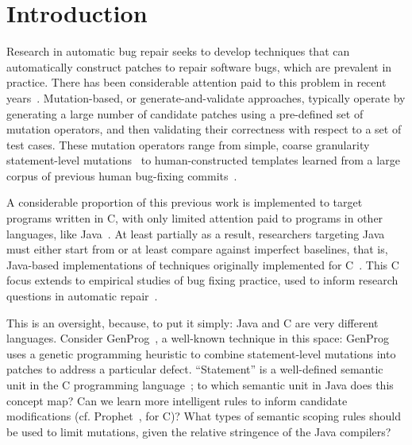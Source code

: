 \documentclass{sig-alternate-05-2015}
\begin{document}
%
%
\printccsdesc



\section{Introduction}

Research in automatic bug repair seeks to develop techniques that can
automatically construct patches to repair software bugs, which are prevalent in
practice. There has been considerable attention paid to this problem in recent
years~\cite{kim2013,weimer2009,legoues2012,pan2009,so,many,more}.
Mutation-based, or generate-and-validate approaches, typically operate by
generating a large number of candidate patches using a pre-defined set of
mutation operators, and then validating their correctness with respect to a set
of test cases.  These mutation operators range from simple, coarse granularity
statement-level mutations~\cite{examples} to human-constructed templates learned
from a large corpus of previous human bug-fixing commits~\cite{kim2013}.

A considerable proportion of this previous work is implemented to target
programs written in C, with only limited attention paid to programs in other
languages, like Java~\cite{kim2013}.  At least partially as a result,
researchers targeting Java must either start from or at least compare against
imperfect baselines, that is, Java-based implementations of techniques
originally implemented for C~\cite{nopol}. %
This C focus extends to empirical studies
of bug fixing practice, used to inform research questions in automatic
repair~\cite{zhong2015}. 

This is an oversight, because, to put it simply: Java and C are very different
languages.  Consider GenProg~\cite{genprog,cites}, a well-known technique in
this space: GenProg uses a genetic programming heuristic to combine
statement-level mutations into patches to address a particular defect.
``Statement'' is a well-defined semantic unit in the C programming
language~\cite{cspec}; to which semantic unit in Java does this concept map?
Can we learn more
intelligent rules to inform candidate modifications
(cf. Prophet~\cite{rinardPopl2016}, for C)?  What types of
semantic scoping rules should be used to limit mutations, given the relative
stringence of the Java compilers? 
\end{document}
